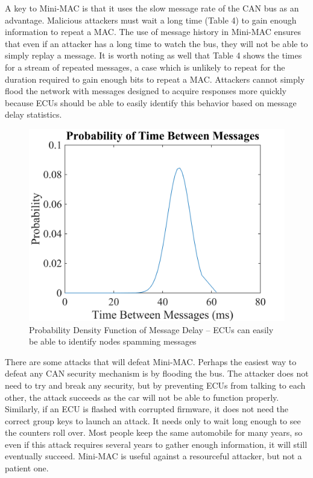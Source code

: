 A key to Mini-MAC is that it uses the slow message rate of the CAN bus as an advantage. Malicious attackers must wait a long time (Table 4) to gain enough information to repeat a MAC. The use of message history in Mini-MAC ensures that even if an attacker has a long time to watch the bus, they will not be able to simply replay a message. It is worth noting as well that Table 4 shows the times for a stream of repeated messages, a case which is unlikely to repeat for the duration required to gain enough bits to repeat a MAC. Attackers cannot simply flood the network with messages designed to acquire responses more quickly because ECUs should be able to easily identify this behavior based on message delay statistics.


	\selectfont
	\begin{figure}
		\centering
		\includegraphics[width=\columnwidth]{figures/pdf.png}
		\caption{{\selectfont Probability Density Function of Message Delay -- ECUs can easily be able to identify nodes spamming messages}}
	\end{figure}
	

There are some attacks that will defeat Mini-MAC. Perhaps the easiest way to defeat any CAN security mechanism is by flooding the bus. The attacker does not need to try and break any security, but by preventing ECUs from talking to each other, the attack succeeds as the car will not be able to function properly. Similarly, if an ECU is flashed with corrupted firmware, it does not need the correct group keys to launch an attack. It needs only to wait long enough to see the counters roll over. Most people keep the same automobile for many years, so even if this attack requires several years to gather enough information, it will still eventually succeed. Mini-MAC is useful against a resourceful attacker, but not a patient one.
